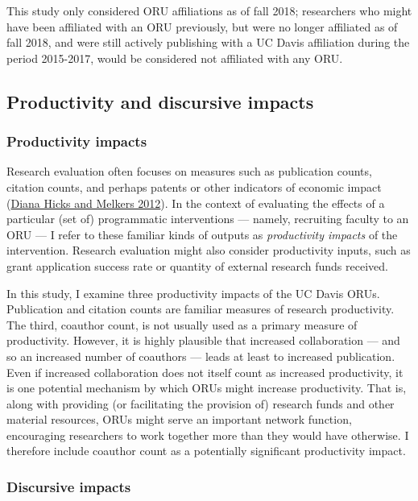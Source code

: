 \documentclass[
  11pt,
]{article}
\begin{document}
This study only considered ORU affiliations as of fall 2018; researchers who might have been affiliated with an ORU previously, but were no longer affiliated as of fall 2018, and were still actively publishing with a UC Davis affiliation during the period 2015-2017, would be considered not affiliated with any ORU.

\hypertarget{productivity-and-discursive-impacts}{%
\subsection{Productivity and discursive impacts}\label{productivity-and-discursive-impacts}}

\hypertarget{productivity-impacts}{%
\subsubsection{Productivity impacts}\label{productivity-impacts}}

Research evaluation often focuses on measures such as publication counts, citation counts, and perhaps patents or other indicators of economic impact (\protect\hyperlink{ref-HicksBibliometricsToolResearch2012}{Diana Hicks and Melkers 2012}). In the context of evaluating the effects of a particular (set of) programmatic interventions --- namely, recruiting faculty to an ORU --- I refer to these familiar kinds of outputs as \emph{productivity impacts} of the intervention. Research evaluation might also consider productivity inputs, such as grant application success rate or quantity of external research funds received.

In this study, I examine three productivity impacts of the UC Davis ORUs. Publication and citation counts are familiar measures of research productivity. The third, coauthor count, is not usually used as a primary measure of productivity. However, it is highly plausible that increased collaboration --- and so an increased number of coauthors --- leads at least to increased publication. Even if increased collaboration does not itself count as increased productivity, it is one potential mechanism by which ORUs might increase productivity. That is, along with providing (or facilitating the provision of) research funds and other material resources, ORUs might serve an important network function, encouraging researchers to work together more than they would have otherwise. I therefore include coauthor count as a potentially significant productivity impact.

\hypertarget{discursive-impacts}{%
\subsubsection{Discursive impacts}\label{discursive-impacts}}
\end{document}
